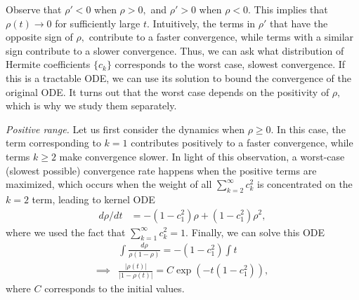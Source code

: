 \documentclass[twoside]{article}
\theoremstyle{definition}
\newcommand{\thomas}[1]{{\color{blue}\textit{#1}}}
\begin{document}
Observe that $\rho'<0$ when $\rho>0,$ and $\rho'>0$ when $\rho<0.$ This implies that $\rho(t) \to 0$ for sufficiently large $t.$ Intuitively, the terms in $\rho'$ that have the opposite sign of $\rho,$ contribute to a faster convergence, while terms with a similar sign contribute to a slower convergence. Thus, we can ask what distribution of Hermite coefficients $\{c_k\}$ corresponds to the worst case, slowest convergence. If this is a tractable ODE, we can use its solution to bound the convergence of the original ODE. It turns out that the worst case depends on the positivity of $\rho,$ which is why we study them separately.

\textit{Positive range.}
Let us first consider the dynamics when $\rho\ge 0.$ 
In this case, the term corresponding to $k=1$ contributes positively to a faster convergence, while terms $k\ge 2$ make convergence slower. In light of this observation, a worst-case (slowest possible) convergence rate happens when the positive terms are maximized, which occurs when the weight of all $\sum_{k=2}^\infty c_k^2 $ is concentrated on the $k=2$ term, leading to kernel ODE
\begin{align*}
    d\rho/dt &=  -(1-c_1^2)\rho + (1-c_1^2) \rho^2,
\end{align*}
where we used the fact that $\sum_{k=1}^\infty c_k^2 = 1.$ 
Finally, we can solve this ODE 
\begin{align*}
    &\int \frac{d\rho}{\rho(1-\rho)} = - (1-c_1^2)\int t \\
    \implies &\frac{|\rho(t)|}{|1-\rho(t)|} = C \exp(-t(1-c_1^2)),
\end{align*}
where $C$ corresponds to the initial values. 
\end{document}
